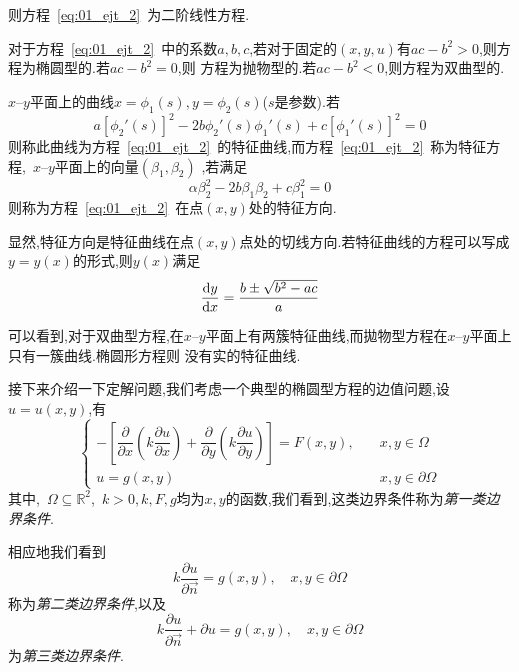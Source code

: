 则方程~\eqref{eq:01_ejt_2}~为二阶线性方程.\par
对于方程~\eqref{eq:01_ejt_2}~中的系数$a,b,c$,若对于固定的$(x,y,u)$有$ac-b^2>0$,则方程为椭圆型的.若$ac-b^2=0$,则
方程为抛物型的.若$ac-b^2<0$,则方程为双曲型的.\par
$x$--$y$平面上的曲线$x=\phi_1(s),y=\phi_2(s)$($s$是参数).若
\begin{equation}
 a[\phi_2'(s)]^2-2b\phi_2'(s)\phi_1'(s)+c[\phi_1'(s)]^2=0
\end{equation}
则称此曲线为方程~\eqref{eq:01_ejt_2}~的特征曲线,而方程~\eqref{eq:01_ejt_2}~称为特征方程,~$x$--$y$平面上的向量$(\beta_1,\beta_2)$
,若满足
\begin{equation}
 \alpha\beta_2^2-2b\beta_1\beta_2+c\beta_1^2=0
\end{equation}
则称为方程~\eqref{eq:01_ejt_2}~在点$(x,y)$处的特征方向.\par
显然,特征方向是特征曲线在点$(x,y)$点处的切线方向.若特征曲线的方程可以写成$y=y(x)$的形式,则$y(x)$满足
\begin{equation}
 \dfrac{\mathrm{d} y}{\mathrm{d} x}=\dfrac{b\pm\sqrt{b^2-ac}}{a}
\end{equation}\par
可以看到,对于双曲型方程,在$x$--$y$平面上有两簇特征曲线,而拋物型方程在$x$--$y$平面上只有一簇曲线.椭圆形方程则
没有实的特征曲线.\par
接下来介绍一下定解问题,我们考虑一个典型的椭圆型方程的边值问题,设$u=u(x,y)$,有
\begin{equation}
 \begin{cases}
  -\left[\dfrac{\partial}{\partial x}\left(k\dfrac{\partial u}{\partial x}\right)+
  \dfrac{\partial}{\partial y}\left(k\dfrac{\partial u}{\partial y}\right)\right]=F(x,y)
  ,&	\quad x,y \in \Omega \\[1em]
  u=g(x,y)	& \quad	x,y\in \partial \Omega
 \end{cases}
\end{equation}
其中,~$\Omega\subseteq\mathbb{R}^2$,~$k>0,k,F,g$均为$x,y$的函数,我们看到,这类边界条件称为\emph{第一类边界条件}.\par
相应地我们看到
\begin{equation}
 k\dfrac{\partial u}{\partial \vec{n}}=g(x,y),\quad x,y\in\partial\Omega
\end{equation}
称为\emph{第二类边界条件},以及
\begin{equation}
 k\dfrac{\partial u}{\partial \vec{n}}+\partial u=g(x,y),\quad x,y\in\partial\Omega
\end{equation}
为\emph{第三类边界条件}.
